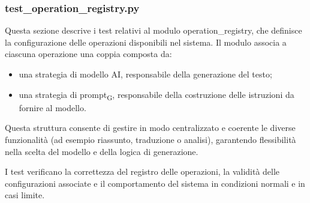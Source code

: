 \documentclass[11pt,a4paper]{article}
\newcommand{\gls}[1]{#1\textsubscript{G}}
\begin{document}
\subsubsection{test\_operation\_registry.py}
Questa sezione descrive i test relativi al modulo operation\_registry, che definisce la configurazione delle operazioni disponibili nel sistema. Il modulo associa a ciascuna operazione una coppia composta da:
\begin{itemize}
    \item una strategia di modello AI, responsabile della generazione del testo;
    \item una strategia di \gls{prompt}, responsabile della costruzione delle istruzioni da fornire al modello.
\end{itemize}
Questa struttura consente di gestire in modo centralizzato e coerente le diverse funzionalità (ad esempio riassunto, traduzione o analisi), garantendo flessibilità nella scelta del modello e della logica di generazione.

I test verificano la correttezza del registro delle operazioni, la validità delle configurazioni associate e il comportamento del sistema in condizioni normali e in casi limite.
\end{document}
